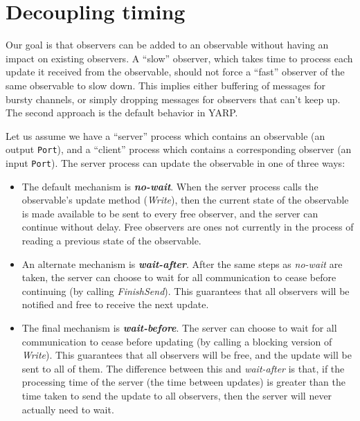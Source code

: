 \section{Decoupling timing}

Our goal is that observers can be added to an observable without
having an impact on existing observers.  
%
A ``slow'' observer, which takes time to process each update it
received from the observable, should not force a ``fast'' observer of
the same observable to slow down.  This implies either buffering
of messages for bursty channels, or simply dropping messages for
observers that can't keep up.  The second approach is the default
behavior in YARP.

Let us assume we have a ``server'' process which contains an
observable (an output {\tt Port}), and a ``client'' process
which contains a corresponding observer (an input {\tt Port}).
The server process can update the observable in one of three ways:

\begin{itemize} \pflist

\item The default mechanism is \textbf{\textit{no-wait}}.  When the
server process calls the observable's update method ({\it Write}),
then the current state of the observable is made available to be sent
to every free observer, and the server can continue without delay.
Free observers are ones not currently in the process of reading a
previous state of the observable.

\item An alternate mechanism is \textbf{\textit{wait-after}}.  After the same 
steps as {\it no-wait} are taken, the server can choose
to wait for all communication to cease before continuing (by 
calling {\it FinishSend}).  This guarantees that all observers will
be notified and free to receive the next update.

\item The final mechanism is \textbf{\textit{wait-before}}.  The server can choose
to wait for all communication to cease before updating (by calling a
blocking version of {\it Write}).  This guarantees that all observers
will be free, and the update will be sent to all of them.  The
difference between this and {\it wait-after} is that, if the processing
time of the server (the time between updates) is greater than the time 
taken to send the update to all observers, then the server will never
actually need to wait.

\end{itemize}

